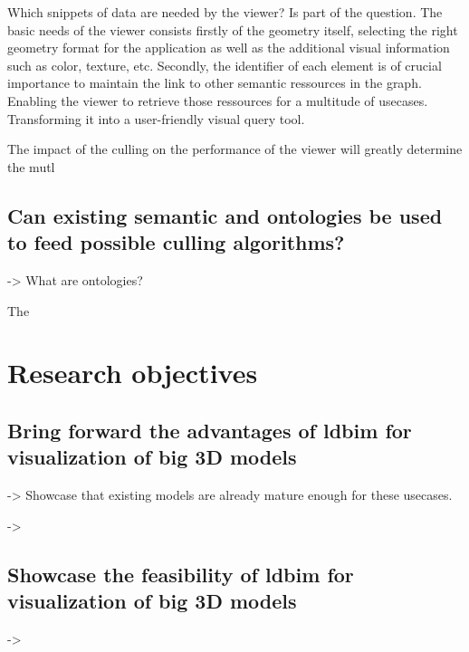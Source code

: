 Which snippets of data are needed by the viewer? Is part of the question. The basic needs of the viewer consists firstly of the geometry itself, selecting the right geometry format for the application as well as the additional visual information such as color, texture, etc. Secondly, the identifier of each element is of crucial importance to maintain the link to other semantic ressources in the graph. Enabling the viewer to retrieve those ressources for a multitude of usecases. Transforming it into a user-friendly visual query tool.

The impact of the culling on the performance of the viewer will greatly determine the mutl

\subsection[Can existing semantic be used?]{Can existing semantic and ontologies be used\\
    to feed possible culling algorithms?}
-> What are ontologies?

The



\section{Research objectives}
\subsection[Advantages of LDBIM]{Bring forward the advantages of \acs{ldbim} for visualization of big 3D models}
-> Showcase that existing models are already mature enough for these usecases.

->
\subsection[Showcase the feasibility]{Showcase the feasibility of \acs{ldbim} for visualization of big 3D models}
->